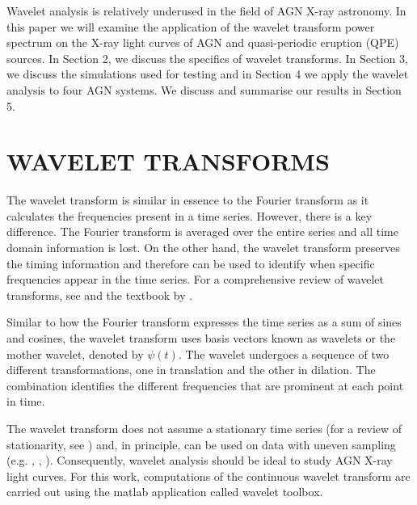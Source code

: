 \documentclass[fleqn,usenatbib]{mnras}
\begin{document}
Wavelet analysis is relatively underused in the field of AGN X-ray astronomy. In this paper we will examine the application of the wavelet transform power spectrum on the X-ray light curves of AGN and quasi-periodic eruption (QPE) sources.  In Section 2, we discuss the specifics of wavelet transforms. In Section 3, we discuss the simulations used for testing and in Section 4 we apply the wavelet analysis to four AGN systems.  We discuss and summarise our results in Section 5.

\section{WAVELET TRANSFORMS}

The wavelet transform is similar in essence to the Fourier transform as it calculates the frequencies present in a time series. However, there is a key difference. The Fourier transform is averaged over the entire series and all time domain information is lost.  On the other hand, the wavelet transform preserves the timing information and therefore can be used to identify when specific frequencies appear in the time series. For a comprehensive review of wavelet transforms, see \cite{torrence1998} and the textbook by \cite{Addison}.

Similar to how the Fourier transform expresses the time series as a  sum of sines and cosines, the wavelet transform uses basis vectors known as wavelets or the mother wavelet, denoted by $\psi(t)$. The wavelet undergoes a sequence of two different transformations, one in translation and the other in dilation. The combination identifies the different frequencies that are prominent at each point in time.

The wavelet transform does not assume a stationary time series (for a review of stationarity, see \citealt{alston2019remarkable}) and, in principle, can be used on data with uneven sampling (e.g. \citealt{foster1996wavelets}, \citealt{daubechies1999wavelets}, \citealt{bravo2014wavelets}).  Consequently, wavelet analysis should be ideal to study AGN X-ray light curves.  
For this work, computations of the continuous wavelet transform are carried out using the {\sc matlab} application called {\sc wavelet toolbox}.

\end{document}
